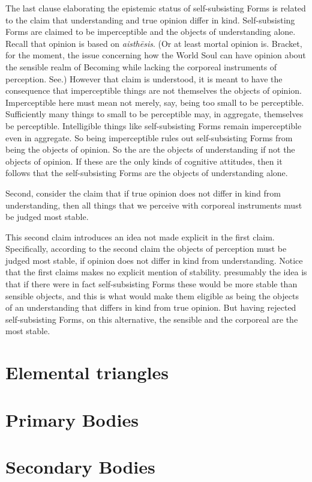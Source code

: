 The last clause elaborating the epistemic status of self-subsisting Forms is related to the claim that understanding and true opinion differ in kind. Self-subsisting Forms are claimed to be imperceptible and the objects of understanding alone. Recall that opinion is based on \emph{aisthēsis}. (Or at least mortal opinion is. Bracket, for the moment, the issue concerning how the World Soul can have opinion about the sensible realm of Becoming while lacking the corporeal instruments of perception. See.) However that claim is understood, it is meant to have the consequence that imperceptible things are not themselves the objects of opinion. Imperceptible here must mean not merely, say, being too small to be perceptible. Sufficiently many things to small to be perceptible may, in aggregate, themselves be perceptible. Intelligible things like self-subsisting Forms remain imperceptible even in aggregate. So being imperceptible rules out self-subsisting Forms from being the objects of opinion. So the are the objects of understanding if not the objects of opinion. If these are the only kinds of cognitive attitudes, then it follows that the self-subsisting Forms are the objects of understanding alone.

Second, consider the claim that if true opinion does not differ in kind from understanding, then all things that we perceive with corporeal instruments must be judged most stable. 

This second claim introduces an idea not made explicit in the first claim. Specifically, according to the second claim the objects of perception must be judged most stable, if opinion does not differ in kind from understanding. Notice that the first claims makes no explicit mention of stability. presumably the idea is that if there were in fact self-subsisting Forms these would be more stable than sensible objects, and this is what would make them eligible as being the objects of an understanding that differs in kind from true opinion. But having rejected self-subsisting Forms, on this alternative, the sensible and the corporeal are the most stable.



\section{Elemental triangles} %
\label{sec:elemental_triangles}




\section{Primary Bodies} %
\label{sec:primary_bodies}




\section{Secondary Bodies} %
\label{sec:secondary_bodies}




